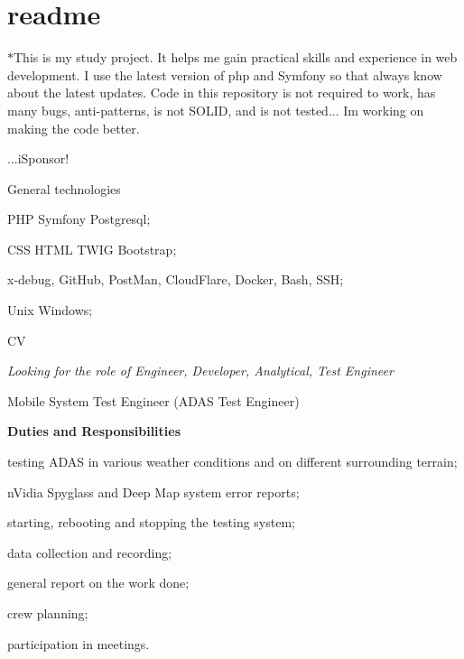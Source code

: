 \chapter{readme}
\hypertarget{md_readme}{}\label{md_readme}
\texorpdfstring{$\ast$}{*}\+This is my study project. It helps me gain practical skills and experience in web development. I use the latest version of php and Symfony so that always know about the latest updates. Code in this repository is not required to work, has many bugs, anti-\/patterns, is not SOLID, and is not tested... I\textquotesingle{}m working on making the code better.

...i\+Sponsor!


\begin{DoxyItemize}
\item General technologies
\item PHP Symfony Postgresql;
\item CSS HTML TWIG Bootstrap;
\item x-\/debug, Git\+Hub, Post\+Man, Cloud\+Flare, Docker, Bash, SSH;
\item Unix Windows;
\end{DoxyItemize}

CV


{\itshape Looking for the role of Engineer, Developer, Analytical, Test Engineer}

\label{md_readme_autotoc_md0}%
%

Mobile System Test Engineer (ADAS Test Engineer)

{\bfseries{Duties and Responsibilities}}


\begin{DoxyItemize}
\item testing ADAS in various weather conditions and on different surrounding terrain;
\item n\+Vidia Spyglass and Deep Map system error reports;
\item starting, rebooting and stopping the testing system;
\item data collection and recording;
\item general report on the work done;
\item crew planning;
\item participation in meetings.
\end{DoxyItemize}

